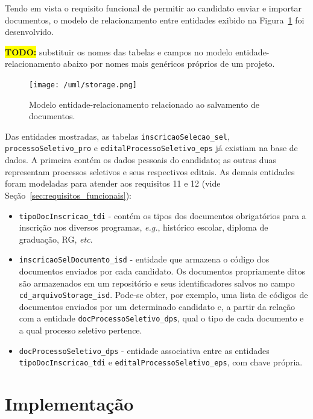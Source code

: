 \documentclass[
  10.5pt,				  %
	openright,			%
	twoside,			  %
  a5paper,
  chapter=TITLE,	%
	section=TITLE,	%
  hyphens,        %
	english,        %
	brazil          %
]{abntex2}
\begin{document}
Tendo em vista o requisito funcional de permitir ao candidato enviar e importar documentos, o modelo de relacionamento entre entidades exibido na Figura~\ref{fig:uml_storage} foi desenvolvido.

\colorbox{yellow}{\textbf{TODO:}} substituir os nomes das tabelas e campos no modelo entidade-relacionamento abaixo por nomes mais genéricos próprios de um projeto.

\begin{figure}[!ht]
  \caption{\label{fig:uml_storage} Modelo entidade-relacionamento relacionado ao salvamento de documentos. }
  \begin{center}
    \texttt{[image: /uml/storage.png]}
  \end{center}
\end{figure}


Das entidades mostradas, as tabelas \texttt{inscricaoSelecao\_sel}, \texttt{processoSeletivo\_pro} e \texttt{editalProcessoSeletivo\_eps} já existiam na base de dados. A primeira contém os dados pessoais do candidato; as outras duas representam processos seletivos e seus respectivos editais. As demais entidades foram modeladas para atender aos requisitos 11 e 12 (vide Seção~\ref{sec:requisitos_funcionais}):

\begin{itemize}
  \item \texttt{tipoDocInscricao\_tdi} - contém os tipos dos documentos obrigatórios para a inscrição nos diversos programas, \emph{e.g.}, histórico escolar, diploma de graduação, RG, \emph{etc}.
  \item \texttt{inscricaoSelDocumento\_isd} - entidade que armazena o código dos documentos enviados por cada candidato. Os documentos propriamente ditos são armazenados em um repositório e seus identificadores salvos no campo \texttt{cd\_arquivoStorage\_isd}. Pode-se obter, por exemplo, uma lista de códigos de documentos enviados por um determinado candidato e, a partir da relação com a entidade \texttt{docProcessoSeletivo\_dps}, qual o tipo de cada documento e a qual processo seletivo pertence.
  \item \texttt{docProcessoSeletivo\_dps} - entidade associativa entre as entidades \texttt{tipoDocInscricao\_tdi} e \texttt{editalProcessoSeletivo\_eps}, com chave própria.
\end{itemize}

\chapter{Implementação}
\end{document}
